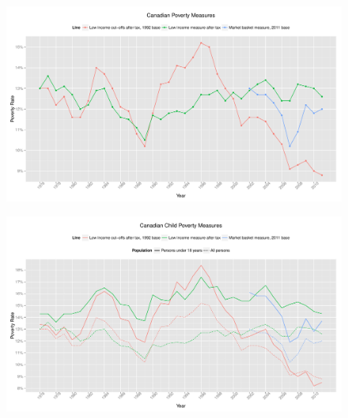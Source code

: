 \documentclass{article}\usepackage[]{graphicx}\usepackage[]{color}
\makeatletter
\def\maxwidth{ %
  \ifdim\Gin@nat@width>\linewidth
    \linewidth
  \else
    \Gin@nat@width
  \fi
}
\newenvironment{knitrout}{}{} %
\makeatother
\begin{document}
\begin{figure}[ht]
\begin{center}
\begin{knitrout}
\color{fgcolor}
\includegraphics[width=\maxwidth]{figure/unnamed-chunk-2} 

\end{knitrout}

\end{center}
\end{figure}
\begin{figure}[ht]
\begin{center}
\begin{knitrout}
\color{fgcolor}
\includegraphics[width=\maxwidth]{figure/unnamed-chunk-3} 

\end{knitrout}

\end{center}
\end{figure}
\end{document}
